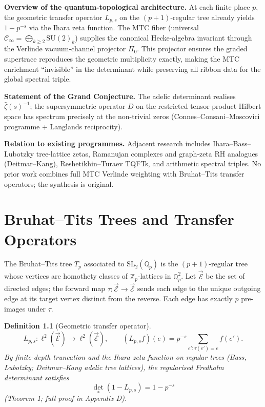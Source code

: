 \documentclass[11pt, oneside]{book}
\newtheorem{definition}[theorem]{Definition}
\begin{document}
\textbf{Overview of the quantum-topological architecture.} At each finite place \(p\), the geometric transfer operator \(L_{p,s}\) on the \((p+1)\)-regular tree already yields \(1-p^{-s}\) via the Ihara zeta function. The MTC fiber (universal \(\mathcal{C}_\infty = \bigoplus_{k\ge 2} \mathrm{SU}(2)_k\)) supplies the canonical Hecke-algebra invariant through the Verlinde vacuum-channel projector \(\Pi_0\). This projector ensures the graded supertrace reproduces the geometric multiplicity exactly, making the MTC enrichment ``invisible'' in the determinant while preserving all ribbon data for the global spectral triple.

\textbf{Statement of the Grand Conjecture.} The adelic determinant realises \(\hat{\zeta}(s)^{-1}\); the supersymmetric operator \(D\) on the restricted tensor product Hilbert space has spectrum precisely at the non-trivial zeros (Connes--Consani--Moscovici programme + Langlands reciprocity).

\textbf{Relation to existing programmes.} Adjacent research includes Ihara--Bass--Lubotzky tree-lattice zetas, Ramanujan complexes and graph-zeta RH analogues (Deitmar--Kang), Reshetikhin--Turaev TQFTs, and arithmetic spectral triples. No prior work combines full MTC Verlinde weighting with Bruhat--Tits transfer operators; the synthesis is original.

\chapter{Bruhat--Tits Trees and Transfer Operators}
\label{ch:trees}

The Bruhat--Tits tree \(T_p\) associated to \(\mathrm{SL}_2(\mathbb{Q}_p)\) is the \((p+1)\)-regular tree whose vertices are homothety classes of \(\mathbb{Z}_p\)-lattices in \(\mathbb{Q}_p^2\). Let \(\vec{\mathcal{E}}\) be the set of directed edges; the forward map \(\tau:\vec{\mathcal{E}}\to\vec{\mathcal{E}}\) sends each edge to the unique outgoing edge at its target vertex distinct from the reverse. Each edge has exactly \(p\) pre-images under \(\tau\).

\begin{definition}[Geometric transfer operator]
\[
L_{p,s}:\ell^2(\vec{\mathcal{E}})\to\ell^2(\vec{\mathcal{E}}),\qquad (L_{p,s}f)(e)=p^{-s}\sum_{e':\tau(e')=e}f(e').
\]
By finite-depth truncation and the Ihara zeta function on regular trees (Bass, Lubotzky; Deitmar--Kang adelic tree lattices), the regularised Fredholm determinant satisfies
\[
\det_*(1-L_{p,s})=1-p^{-s}
\]
(Theorem 1; full proof in Appendix D).
\end{definition}
\end{document}
